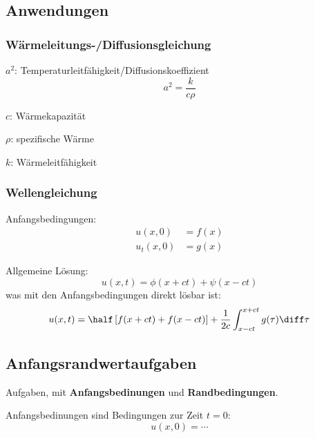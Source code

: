 	\subsection{Anwendungen} %
		\subsubsection{Wärmeleitungs-/Diffusionsgleichung} %
			\begin{tightitemize}
				\item[$a^2$:] Temperaturleitfähigkeit/Diffusionskoeffizient
				\begin{equation*}
					a^2 = \frac{k}{c \rho}
				\end{equation*}
				\item[$c$:] Wärmekapazität
				\item[$\rho$:] spezifische Wärme
				\item[$k$:] Wärmeleitfähigkeit
			\end{tightitemize}
		
		\subsubsection{Wellengleichung} %
			
			Anfangsbedingungen:
			\begin{align*}
				u(x,0) &= f(x) \\
				u_t(x,0) &= g(x)
			\end{align*}
			
			Allgemeine Lösung:
			\[
				u(x,t) = \phi(x+ct) + \psi(x-ct)
			\]
			was mit den Anfangsbedingungen direkt lösbar ist:
			\[
				u(x,t) = \half \left[
					f(x+ct) + f(x-ct)
				\right]
				+ \frac{1}{2c} \int_{x-ct}^{x+ct} g(\tau) \diff \tau
			\]
	\subsection{Anfangsrandwertaufgaben} %
		Aufgaben, mit \textbf{Anfangsbedinungen} und \textbf{Randbedingungen}.
		
		Anfangsbedinungen sind Bedingungen zur Zeit $t = 0$:
		\begin{equation*}
			u(x,0) = \cdots
		\end{equation*}
		
